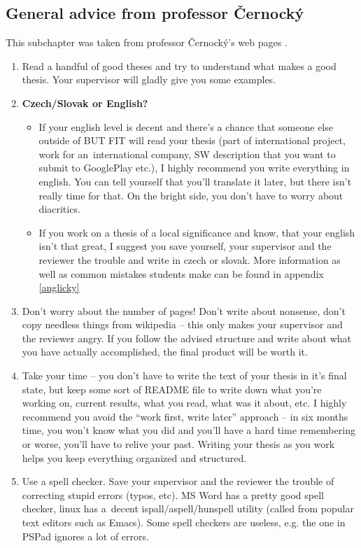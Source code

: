 \subsection{General advice from professor Černocký}

This subchapter was taken from professor Černocký's web pages \cite{Cernocky}.

\begin{enumerate}
  \item{Read a handful of good theses and try to understand what makes a good thesis. Your supervisor will gladly give you some examples.}
  \item{\textbf{Czech/Slovak or English?}
  	\begin{itemize}
  	\item If your english level is decent and there's a chance that someone else outside of BUT FIT will read your thesis (part of international project, work for an~international company, SW description that you want to submit to GooglePlay etc.), I highly recommend you write everything in english. You can tell yourself that you'll translate it later, but there isn't really time for that. On the bright side, you don't have to worry about diacritics.
    \item If you work on a thesis of a local significance and know, that your english isn't that great, I suggest you save yourself, your supervisor and the reviewer the trouble and write in czech or slovak. More information as well as common mistakes students make can be found in appendix \ref{anglicky}
  	\end{itemize}
  }
  \item{Don't worry about the number of pages! Don't write about nonsense, don't copy needless things from wikipedia -- this only makes your supervisor and the reviewer angry. If you follow the advised structure and write about what you have actually accomplished, the final product will be worth it.}
  \item{Take your time -- you don't have to write the text of your thesis in it's final state, but keep some sort of README file to write down what you're working on, current results, what you read, what was it about, etc. I highly recommend you avoid the ``work first, write later'' approach -- in six months time, you won't know what you did and you'll have a hard time remembering or worse, you'll have to relive your past. Writing your thesis as you work helps you keep everything organized and structured.}
  \item{Use a spell checker. Save your supervisor and the reviewer the trouble of correcting stupid errors (typos, etc). MS Word has a pretty good spell checker, linux has a~decent ispall/aspell/hunspell utility (called from popular text editors such as Emacs). Some spell checkers are useless, e.g. the one in PSPad ignores a lot of errors.}

\end{enumerate}
